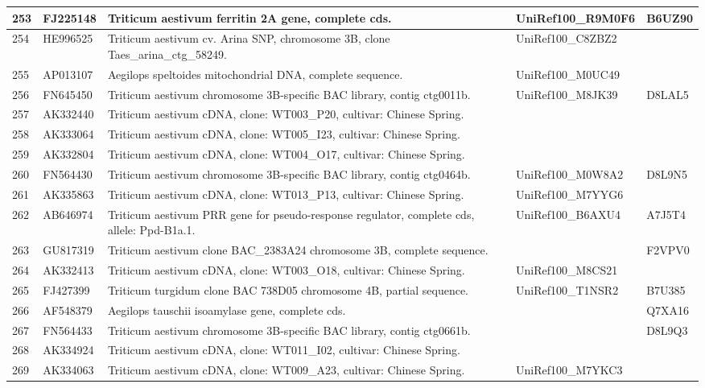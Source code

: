 \documentclass[10.9pt]{article} %
\begin{document}
{\begin{longtable}{|p{1.3cm}|p{1.8cm}|p{6.2cm}|p{3.8cm}|p{2cm}|}
\hline
253 & FJ225148 & Triticum aestivum ferritin 2A gene, complete cds. & UniRef100\_R9M0F6 & B6UZ90\\
\hline
254 & HE996525 & Triticum aestivum cv. Arina SNP, chromosome 3B, clone Taes\_arina\_ctg\_58249. & UniRef100\_C8ZBZ2 & \\
\hline
255 & AP013107 & Aegilops speltoides mitochondrial DNA, complete sequence. & UniRef100\_M0UC49 & \\
\hline
256 & FN645450 & Triticum aestivum chromosome 3B-specific BAC library, contig ctg0011b. & UniRef100\_M8JK39 & D8LAL5\\
\hline
257 & AK332440 & Triticum aestivum cDNA, clone: WT003\_P20, cultivar: Chinese Spring. &  & \\
\hline
258 & AK333064 & Triticum aestivum cDNA, clone: WT005\_I23, cultivar: Chinese Spring. &  & \\
\hline
259 & AK332804 & Triticum aestivum cDNA, clone: WT004\_O17, cultivar: Chinese Spring. &  & \\
\hline
260 & FN564430 & Triticum aestivum chromosome 3B-specific BAC library, contig ctg0464b. & UniRef100\_M0W8A2 & D8L9N5\\
\hline
261 & AK335863 & Triticum aestivum cDNA, clone: WT013\_P13, cultivar: Chinese Spring. & UniRef100\_M7YYG6 & \\
\hline
262 & AB646974 & Triticum aestivum PRR gene for pseudo-response regulator, complete cds, allele: Ppd-B1a.1. & UniRef100\_B6AXU4 & A7J5T4\\
\hline
263 & GU817319 & Triticum aestivum clone BAC\_2383A24 chromosome 3B, complete sequence. &  & F2VPV0\\
\hline
264 & AK332413 & Triticum aestivum cDNA, clone: WT003\_O18, cultivar: Chinese Spring. & UniRef100\_M8CS21 & \\
\hline
265 & FJ427399 & Triticum turgidum clone BAC 738D05 chromosome 4B, partial sequence. & UniRef100\_T1NSR2 & B7U385\\
\hline
266 & AF548379 & Aegilops tauschii isoamylase gene, complete cds. &  & Q7XA16\\
\hline
267 & FN564433 & Triticum aestivum chromosome 3B-specific BAC library, contig ctg0661b. &  & D8L9Q3\\
\hline
268 & AK334924 & Triticum aestivum cDNA, clone: WT011\_I02, cultivar: Chinese Spring. &  & \\
\hline
269 & AK334063 & Triticum aestivum cDNA, clone: WT009\_A23, cultivar: Chinese Spring. & UniRef100\_M7YKC3 & \\

\end{longtable}}
\end{document}
